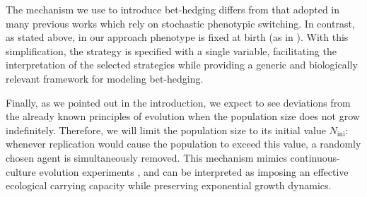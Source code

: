 \documentclass[aps,pre,reprint,10pt,superscriptaddress]{revtex4-2}
\begin{document}
The mechanism we use to introduce bet-hedging differs from that adopted in many previous works \cite{kussellPhenotypicDiversityPopulation2005,patraEmergencePhenotypeSwitching2015,bressloffStochasticSwitchingBiology2017,huftonPhenotypicSwitchingPopulations2018,villamartinBethedgingStrategiesExpanding2019,dinisParetooptimalTradeoffPhenotypic2022} which rely on stochastic phenotypic switching. In contrast, as stated above, in our approach phenotype is fixed at birth (as in \cite{xueBetHedgingDemographic2017}). With this simplification, the strategy is specified with a single variable, facilitating the interpretation of the selected strategies while providing a generic and biologically relevant framework for modeling bet-hedging.

Finally, as we pointed out in the introduction, we expect to see deviations from the already known principles of evolution when the population size does not grow indefinitely. Therefore, we will limit the population size to its initial value $N_\text{ini}$: whenever replication would cause the population to exceed this value, a randomly chosen agent is simultaneously removed. This mechanism mimics continuous-culture evolution experiments \cite{collectiveEconomicPrinciplesCell}, and can be interpreted as imposing an effective ecological carrying capacity while preserving exponential growth dynamics.
\end{document}

